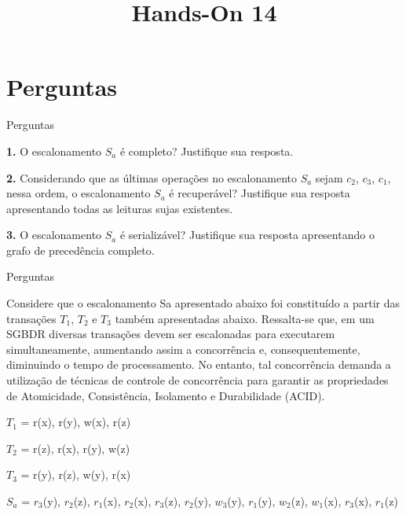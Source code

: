 \documentclass[aspectratio=169]{beamer}
\title{Hands-On 14}
\begin{document}
    \begin{frame}

    \titlepage

    \end{frame}

    \section{Perguntas}

    \begin{frame}{Perguntas}


        \textbf{1.} O escalonamento $S_a$ é completo? Justifique sua resposta.

        \textbf{2.} Considerando que as últimas operações no escalonamento $S_a$ 
        sejam $c_2$, $c_3$, $c_1$, nessa ordem, o escalonamento $S_a$ é recuperável? 
        Justifique sua resposta apresentando todas as leituras sujas 
        existentes.

        \textbf{3.} O escalonamento $S_a$ é serializável? Justifique sua resposta 
        apresentando o grafo de precedência completo.


    \end{frame}
    \begin{frame}{Perguntas}

        Considere que o escalonamento Sa apresentado abaixo foi constituído
        a partir das transações $T_1$, $T_2$ e $T_3$ também apresentadas abaixo. 
        Ressalta-se que, em um SGBDR diversas transações devem ser escalonadas
        para executarem simultaneamente, aumentando assim a concorrência e,
        consequentemente, diminuindo o tempo de processamento. No entanto, 
        tal concorrência demanda a utilização de técnicas de controle de 
        concorrência para garantir as propriedades de Atomicidade, 
        Consistência, Isolamento e Durabilidade (ACID). \newline

            $T_1$ = r(x), r(y), w(x), r(z)

            $T_2$ = r(z), r(x), r(y), w(z)

            $T_3$ = r(y), r(z), w(y), r(x)

            $S_a$ = $r_3$(y), $r_2$(z), $r_1$(x), $r_2$(x), $r_3$(z), $r_2$(y), $w_3$(y),
            $r_1$(y), $w_2$(z), $w_1$(x), $r_3$(x), $r_1$(z)

        

    \end{frame}
\end{document}
